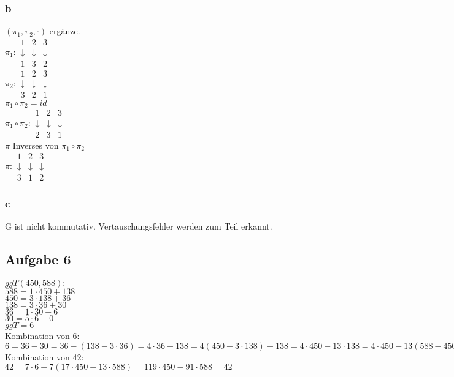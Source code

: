 \subsubsection{b} $(\pi_1,\pi_2,\cdot)$ ergänze.\\
$\pi_1:
\begin{array}{ccc}
1 & 2 & 3 \\ 
\downarrow & \downarrow & \downarrow \\ 
1 & 3 & 2
\end{array} 
$
\\
$\pi_2:
\begin{array}{ccc}
1 & 2 & 3 \\ 
\downarrow & \downarrow & \downarrow \\ 
3 & 2 & 1
\end{array} 
$
\\
$\pi_1 \circ \pi_2 = id$\\
$\pi_1 \circ \pi_2: 
\begin{array}{ccc}
1 & 2 & 3 \\ 
\downarrow & \downarrow & \downarrow \\ 
2 & 3 & 1
\end{array} 
$
\\
$\pi$ Inverses von $\pi_1 \circ \pi_2$\\
$\pi:
\begin{array}{ccc}
1 & 2 & 3 \\ 
\downarrow & \downarrow & \downarrow \\ 
3 & 1 & 2
\end{array} 
$

\subsubsection{c} G ist nicht kommutativ. Vertauschungsfehler werden zum Teil erkannt. 

\subsection{Aufgabe 6}
$ggT(450,588):$\\
$588=1\cdot 450+138$\\
$450=3\cdot 138+36$\\
$138=3\cdot 36+30$\\
$36=1\cdot 30+6$\\
$30=5\cdot 6+0$\\
$ggT=6$\\

Kombination von 6:\\
$6=36-30=36-(138-3\cdot 36)=4\cdot 36-138=4(450-3\cdot 138)-138=4\cdot 450-13\cdot 138=4\cdot 450-13(588-450)=17\cdot 450-13\cdot 588=6$\\
Kombination von 42:\\
$42=7\cdot 6-7(17\cdot 450-13\cdot 588)=119\cdot 450-91\cdot 588=42$ 
